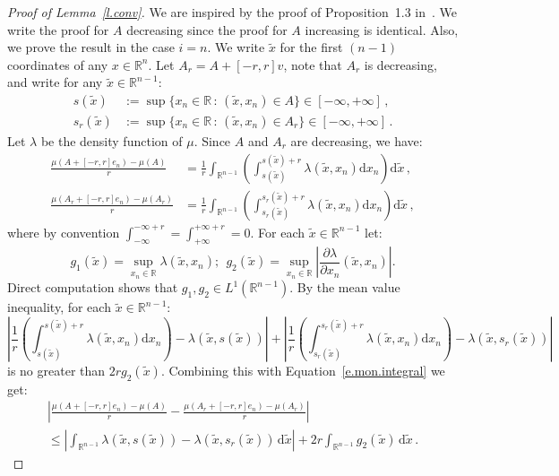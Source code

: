 \documentclass[11pt]{article}
\theoremstyle{definition}
\numberwithin{equation}{section}
\newcommand{\R}{\mathbb{R}}
\newcommand*{\dd}{\mathrm{d}}
\newcommand*{\dx}{\dd x}
\begin{document}
\begin{proof}[Proof of Lemma~\ref{l.conv}] We are inspired by the proof of Proposition~1.3 in~\cite{keller2012geometric}. We write the proof for $A$ decreasing since the proof for $A$ increasing is identical. Also, we prove the result in the case $i = n$. We write $\tilde{x}$ for the first $(n-1)$ coordinates of any $x\in\R^n$. Let $A_r = A + [-r,r]v$, note that $A_r$ is decreasing, and write for any $\tilde{x}\in\R^{n-1}$:
\begin{align*}
s(\tilde{x}) &:= \sup \lbrace x_n \in \R \, : \, (\tilde{x}, x_n) \in A \rbrace \in [-\infty,+\infty] \,,\\
s_r(\tilde{x}) &:= \sup \lbrace x_n \in \R \, : \, (\tilde{x}, x_n) \in A_r \rbrace \in [-\infty,+\infty] \,.
\end{align*}
Let $\lambda$ be the density function of $\mu$. Since $A$ and $A_r$ are decreasing, we have:
\begin{align}\label{e.mon.integral}
\frac{\mu (A + [-r,r] e_n) - \mu (A)}{r} &= \frac{1}{r} \int_{\R^{n-1}} \left(\int_{s(\tilde{x})}^{s(\tilde{x})+r} \lambda(\tilde{x},x_n) \dd x_n\right)\dd\tilde{x} \,, \nonumber\\
\frac{\mu (A_r + [-r,r] e_n) - \mu (A_r)}{r} &= \frac{1}{r} \int_{\R^{n-1}} \left(\int_{s_r(\tilde{x})}^{s_r(\tilde{x})+r} \lambda(\tilde{x},x_n) \dd x_n\right)\dd\tilde{x} \,,
\end{align}
where by convention $\int_{-\infty}^{-\infty+r} = \int_{+\infty}^{+\infty+r} = 0$. For each $\tilde{x}\in\R^{n-1}$ let:
\[
g_1(\tilde{x})=\sup_{x_n\in\R}\lambda(\tilde{x},x_n);\: \: g_2(\tilde{x})=\sup_{x_n\in\R}\left|\frac{\partial\lambda}{\partial x_n}(\tilde{x},x_n)\right|.
\]
Direct computation shows that $g_1,g_2\in L^1(\R^{n-1})$. By the mean value inequality, for each $\tilde{x}\in\R^{n-1}$:
\[
\left|\frac{1}{r}\left(\int_{s(\tilde{x})}^{s(\tilde{x})+r} \lambda(\tilde{x},x_n) \dx_n\right)-\lambda(\tilde{x},s(\tilde{x}))\right|+\left|\frac{1}{r}\left(\int_{s_r(\tilde{x})}^{s_r(\tilde{x})+r} \lambda(\tilde{x},x_n) \dd x_n\right)-\lambda(\tilde{x},s_r(\tilde{x}))\right|
\]
is no greater than $2rg_2(\tilde{x})$. Combining this with Equation~\eqref{e.mon.integral} we get:
\begin{multline*}
\left|\frac{\mu (A + [-r,r] e_n) - \mu (A)}{r}- \frac{\mu (A_r + [-r,r] e_n) - \mu (A_r)}{r} \right|\\
\leq \left|\int_{\R^{n-1}}\lambda(\tilde{x},s(\tilde{x})) -\lambda(\tilde{x},s_r(\tilde{x})) \, \dd\tilde{x}\right|+2r\int_{\R^{n-1}}g_2(\tilde{x}) \, \dd\tilde{x}\,.

\end{multline*}
\end{proof}
\end{document}

